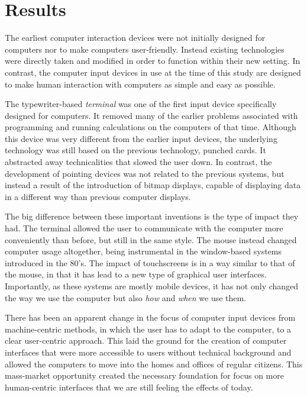 \section{Results}

The earliest computer interaction devices were not initially designed for computers nor to make computers user-friendly. Instead existing technologies were directly taken and modified in order to function within their new setting. In contrast, the computer input devices in use at the time of this study are designed to make human interaction with computers as simple and easy as possible.

The typewriter-based \emph{terminal} was one of the first input device specifically designed for computers. It removed many of the earlier problems associated with programming and running calculations on the computers of that time. Although this device was very different from the earlier input devices, the underlying technology was still based on the previous technology, punched cards. It abstracted away technicalities that slowed the user down. In contrast, the development of pointing devices was not related to the previous systems, but instead a result of the introduction of bitmap displays, capable of displaying data in a different way than previous computer displays.

The big difference between these important inventions is the type of impact they had. The terminal allowed the user to communicate with the computer more conveniently than before, but still in the same style. The mouse instead changed computer usage altogether, being instrumental in the window-based systems introduced in the 80's. The impact of touchscreens is in a way similar to that of the mouse, in that it has lead to a new type of graphical user interfaces. Importantly, as these systems are mostly mobile devices, it has not only changed the way we use the computer but also \emph{how} and \emph{when} we use them.

There has been an apparent change in the focus of computer input devices from machine-centric methods, in which the user has to adapt to the computer, to a clear user-centric approach. This laid the ground for the creation of computer interfaces that were more accessible to users without technical background and allowed the computers to move into the homes and offices of regular citizens. This mass-market opportunity created the necessary foundation for focus on more human-centric interfaces that we are still feeling the effects of today.

